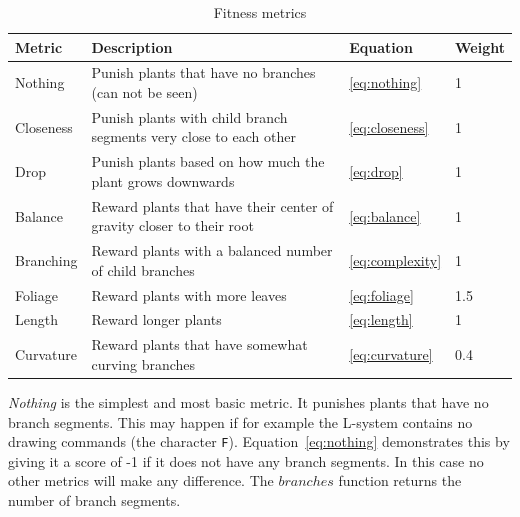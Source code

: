 \begin{table}
    \centering
    \begin{tabularx}{\textwidth}{| l | X | l | l |}
    \hline
    \textbf{Metric} & \textbf{Description} & \textbf{Equation} & \textbf{Weight} \\
    \hline
    Nothing & Punish plants that have no branches (can not be seen) & \ref{eq:nothing} & 1 \\
    \hline
    Closeness & Punish plants with child \glspl{branch segment} very close to each other & \ref{eq:closeness} & 1 \\
    \hline
    Drop & Punish plants based on how much the plant grows downwards & \ref{eq:drop} & 1 \\
    \hline
    Balance & Reward plants that have their center of gravity closer to their root & \ref{eq:balance} & 1 \\
    \hline
    Branching & Reward plants with a balanced number of child branches & \ref{eq:complexity} & 1 \\
    \hline
    Foliage & Reward plants with more leaves & \ref{eq:foliage} & 1.5 \\
    \hline
    Length & Reward longer plants & \ref{eq:length} & 1 \\
    \hline
    Curvature & Reward plants that have somewhat curving branches & \ref{eq:curvature} & 0.4 \\
    \hline
    \end{tabularx}
    \caption{Fitness metrics}
    \label{tab:fitness}
\end{table}

\textit{Nothing} is the simplest and most basic metric.
It punishes plants that have no \glspl{branch segment}.
This may happen if for example the \gls{L-system} contains no drawing commands (the character \texttt{F}).
Equation~\ref{eq:nothing} demonstrates this by giving it a score of -1 if it does not have any \glspl{branch segment}.
In this case no other metrics will make any difference.
The $branches$ function returns the number of \glspl{branch segment}.

